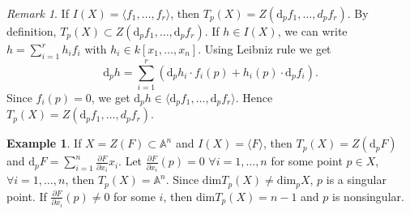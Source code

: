 \documentclass{amsart}
\theoremstyle{plain}
\theoremstyle{definition}
\newtheorem{example}{Example}
\theoremstyle{remark}
\newtheorem*{remark}{Remark}
\numberwithin{equation}{section}
\begin{document}
\begin{remark}
	If $ I(X)=\langle f_1,\dots,f_r\rangle $, then $ T_p(X)=Z(\mathrm{d}_pf_1,\dots,d_p f_r) $. By definition, $ T_p(X)\subset Z(\mathrm{d}_pf_1,\dots,\mathrm{d}_pf_r) $. If $ h\in I(X) $, we can write $ h=\sum\limits_{i=1}^{r}h_if_i $ with $ h_i\in k[x_1,\dots,x_n] $.  Using Leibniz rule we get 
	$$
	\mathrm{d}_p h=\sum\limits_{i=1}^{r}(\mathrm{d}_ph_i\cdot f_i(p)+h_i(p)\cdot \mathrm{d}_pf_i).
	$$
	Since $ f_i(p)=0 $, we get $ \mathrm{d}_p h \in \langle \mathrm{d}_pf_1,\dots,\mathrm{d}_pf_r \rangle $. Hence $ T_p(X)=Z(\mathrm{d}_pf_1,\dots,d_p f_r)  $.
\end{remark}
\begin{example}
	If $ X=Z(F) \subset \mathbb{A}^n$ and $ I(X)=\langle F \rangle $, then $ T_p(X)=Z(\mathrm{d}_pF) $ and $ \mathrm{d}_pF=\sum\limits_{i=1}^{n}\frac{\partial F}{\partial x_i}x_i $. Let $ \frac{\partial F}{\partial x_i}(p)=0 $ $ \forall i=1,\dots,n $ for some point $ p\in X $, $ \forall i=1,\dots,n $, then $ T_p(X)=\mathbb{A}^n $. Since $ \mathrm{dim}T_p(X)\neq \mathrm{dim}_pX $, $ p $ is a singular point. If $ \frac{\partial F}{\partial x_i}(p)\neq 0 $ for some $ i $, then $ \mathrm{dim}T_p(X)=n-1 $ and $ p $ is nonsingular.
\end{example}
\end{document}
